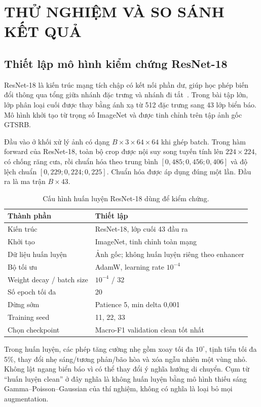 \section{THỬ NGHIỆM VÀ SO SÁNH KẾT QUẢ}
\subsection{Thiết lập mô hình kiểm chứng ResNet-18}
ResNet-18 là kiến trúc mạng tích chập có kết nối phần dư, giúp học phép biến đổi thông qua tổng giữa nhánh đặc trưng và nhánh đi tắt~\cite{resnet}. Trong bài tập lớn, lớp phân loại cuối được thay bằng ánh xạ từ 512 đặc trưng sang 43 lớp biển báo. Mô hình khởi tạo từ trọng số ImageNet và được tinh chỉnh trên tập ảnh gốc GTSRB.

Đầu vào ở khối xử lý ảnh có dạng $B\times3\times64\times64$ khi ghép batch. Trong hàm forward của ResNet-18, toàn bộ crop được nội suy song tuyến tính lên $224\times224$, có chống răng cưa, rồi chuẩn hóa theo trung bình $[0,485;0,456;0,406]$ và độ lệch chuẩn $[0,229;0,224;0,225]$. Chuẩn hóa được áp dụng đúng một lần. Đầu ra là ma trận $B\times43$.

\begin{table}[htbp]
\centering
\caption{Cấu hình huấn luyện ResNet-18 dùng để kiểm chứng.}
\begin{tabular}{P{6.1cm}P{8.0cm}}
\toprule
Thành phần & Thiết lập \\
\midrule
Kiến trúc & ResNet-18, lớp cuối 43 đầu ra \\
Khởi tạo & ImageNet, tinh chỉnh toàn mạng \\
Dữ liệu huấn luyện & Ảnh gốc; không huấn luyện riêng theo enhancer \\
Bộ tối ưu & AdamW, learning rate $10^{-4}$ \\
Weight decay / batch size & $10^{-4}$ / 32 \\
Số epoch tối đa & 20 \\
Dừng sớm & Patience 5, min delta 0,001 \\
Training seed & 11, 22, 33 \\
Chọn checkpoint & Macro-F1 validation clean tốt nhất \\
\bottomrule
\end{tabular}
\end{table}

Trong huấn luyện, các phép tăng cường nhẹ gồm xoay tối đa $10^\circ$, tịnh tiến tối đa 5\%, thay đổi nhẹ sáng/tương phản/bão hòa và xóa ngẫu nhiên một vùng nhỏ. Không lật ngang biển báo vì có thể thay đổi ý nghĩa hướng di chuyển. Cụm từ ``huấn luyện clean'' ở đây nghĩa là không huấn luyện bằng mô hình thiếu sáng Gamma--Poisson--Gaussian của thí nghiệm, không có nghĩa là loại bỏ mọi augmentation.

